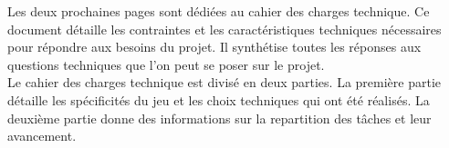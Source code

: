 Les deux prochaines pages sont dédiées au cahier des charges technique.
Ce document détaille les contraintes et les caractéristiques techniques nécessaires pour répondre aux besoins du projet.
Il synthétise toutes les réponses aux questions techniques que l'on peut se poser sur le projet.
\\

Le cahier des charges technique est divisé en deux parties.
La première partie détaille les spécificités du jeu et les choix techniques qui ont été réalisés. 
La deuxième partie donne des informations sur la repartition des tâches et leur avancement.





